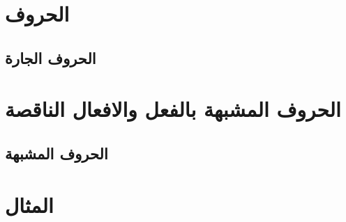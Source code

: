 \documentclass[12pt,twoside]{report}
\begin{document}
\chapter{الحروف}

\section{الحروف الجارة}



\chapter{الحروف المشبهة بالفعل والافعال الناقصة}

\section{الحروف المشبهة}



\chapter{المثال}



\appendix


\printbibliography
\end{document}
